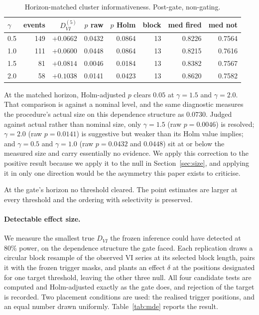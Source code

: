 \documentclass[12pt,letterpaper]{article}
\begin{document}
\begin{table}[h]
\centering
\caption{Horizon-matched cluster informativeness. Post-gate, non-gating.}
\label{tab:horizon}
\small
\begin{tabular}{lrrrrrrr}
\toprule
$\gamma$ & events & $D_{VI}^{(5)}$ & $p$ raw & $p$ Holm & block & med fired & med not \\
\midrule
0.5 & 149 & $+0.0662$ & 0.0432 & 0.0864 & 13 & 0.8226 & 0.7564 \\
1.0 & 111 & $+0.0600$ & 0.0448 & 0.0864 & 13 & 0.8215 & 0.7616 \\
1.5 &  81 & $+0.0814$ & 0.0046 & 0.0184 & 13 & 0.8382 & 0.7567 \\
2.0 &  58 & $+0.1038$ & 0.0141 & 0.0423 & 13 & 0.8620 & 0.7582 \\
\bottomrule
\end{tabular}
\end{table}

At the matched horizon, Holm-adjusted $p$ clears $0.05$ at $\gamma = 1.5$ and
$\gamma = 2.0$. That comparison is against a nominal level, and the same diagnostic
measures the procedure's actual size on this dependence structure as $0.0730$. Judged
against actual rather than nominal size, only $\gamma = 1.5$ (raw $p = 0.0046$) is resolved; $\gamma = 2.0$ (raw $p = 0.0141$) is
suggestive but weaker than its Holm value implies; and $\gamma = 0.5$ and $\gamma = 1.0$
(raw $p = 0.0432$ and $0.0448$) sit at or below the measured size and carry essentially no evidence. We apply this correction to
the positive result because we apply it to the null in Section~\ref{sec:size}, and
applying it in only one direction would be the asymmetry this paper exists to criticise.

At the gate's horizon no threshold cleared. The point estimates are larger at every
threshold and the ordering with selectivity is preserved.

\paragraph{Detectable effect size.}
We measure the smallest true $D_{VI}$ the frozen inference could have detected at $80\%$
power, on the dependence structure the gate faced. Each replication draws a circular
block resample of the observed VI series at its selected block length, pairs it with the
frozen trigger masks, and plants an effect $\delta$ at the positions designated for one
target threshold, leaving the other three null. All four candidate tests are computed and
Holm-adjusted exactly as the gate does, and rejection of the target is recorded. Two
placement conditions are used: the realised trigger positions, and an equal number drawn
uniformly. Table~\ref{tab:mde} reports the result.
\end{document}

